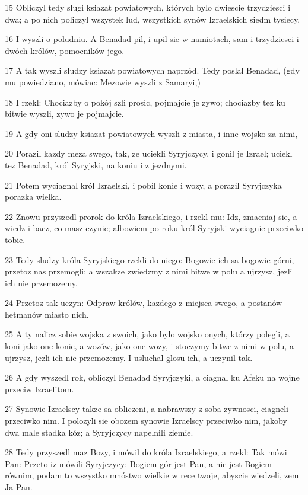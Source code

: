 \par 15 Obliczyl tedy slugi ksiazat powiatowych, których bylo dwiescie trzydziesci i dwa; a po nich policzyl wszystek lud, wszystkich synów Izraelskich siedm tysiecy.
\par 16 I wyszli o poludniu. A Benadad pil, i upil sie w namiotach, sam i trzydziesci i dwóch królów, pomocników jego.
\par 17 A tak wyszli sludzy ksiazat powiatowych naprzód. Tedy poslal Benadad, (gdy mu powiedziano, mówiac: Mezowie wyszli z Samaryi,)
\par 18 I rzekl: Chociazby o pokój szli prosic, pojmajcie je zywo; chociazby tez ku bitwie wyszli, zywo je pojmajcie.
\par 19 A gdy oni sludzy ksiazat powiatowych wyszli z miasta, i inne wojsko za nimi,
\par 20 Porazil kazdy meza swego, tak, ze uciekli Syryjczycy, i gonil je Izrael; uciekl tez Benadad, król Syryjski, na koniu i z jezdnymi.
\par 21 Potem wyciagnal król Izraelski, i pobil konie i wozy, a porazil Syryjczyka porazka wielka.
\par 22 Znowu przyszedl prorok do króla Izraelskiego, i rzekl mu: Idz, zmacniaj sie, a wiedz i bacz, co masz czynic; albowiem po roku król Syryjski wyciagnie przeciwko tobie.
\par 23 Tedy sludzy króla Syryjskiego rzekli do niego: Bogowie ich sa bogowie górni, przetoz nas przemogli; a wszakze zwiedzmy z nimi bitwe w polu a ujrzysz, jezli ich nie przemozemy.
\par 24 Przetoz tak uczyn: Odpraw królów, kazdego z miejsca swego, a postanów hetmanów miasto nich.
\par 25 A ty nalicz sobie wojska z swoich, jako bylo wojsko onych, którzy polegli, a koni jako one konie, a wozów, jako one wozy, i stoczymy bitwe z nimi w polu, a ujrzysz, jezli ich nie przemozemy. I usluchal glosu ich, a uczynil tak.
\par 26 A gdy wyszedl rok, obliczyl Benadad Syryjczyki, a ciagnal ku Afeku na wojne przeciw Izraelitom.
\par 27 Synowie Izraelscy takze sa obliczeni, a nabrawszy z soba zywnosci, ciagneli przeciwko nim. I polozyli sie obozem synowie Izraelscy przeciwko nim, jakoby dwa male stadka kóz; a Syryjczycy napelnili ziemie.
\par 28 Tedy przyszedl maz Bozy, i mówil do króla Izraelskiego, a rzekl: Tak mówi Pan: Przeto iz mówili Syryjczycy: Bogiem gór jest Pan, a nie jest Bogiem równim, podam to wszystko mnóstwo wielkie w rece twoje, abyscie wiedzeli, zem Ja Pan.
